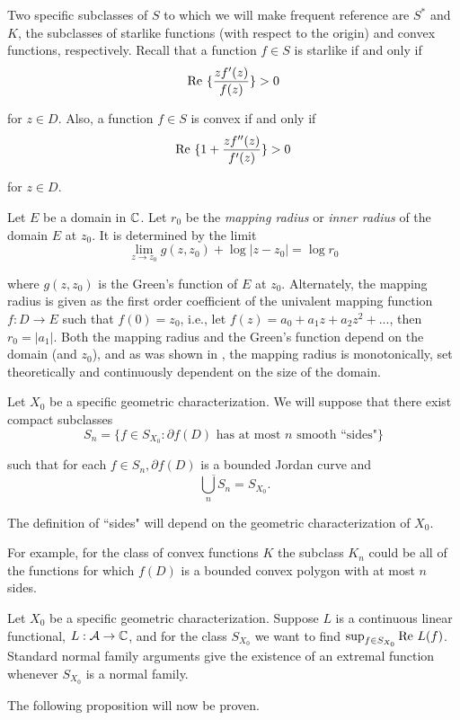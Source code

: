 \documentclass[final]{siamltex}
\begin{document}
Two specific subclasses of $S$ to which we will make frequent reference are $S^*$ and $K$, the subclasses of starlike functions 
(with respect to the origin) and convex functions, respectively. Recall that a function $f \in S$ is starlike if and only if 
$${\rm Re} \  \{ \frac{z f'(z)}{f(z)} \} > 0 $$

\noindent for $z \in D$. Also, a function $f \in S$ is convex if and only if 
$${\rm Re} \  \{ 1 + \frac{z f''(z)}{f'(z)} \} > 0 $$

\noindent for $z \in D$.

Let $E$ be a domain in $\Bbb  C$.  Let $r_0$ be the {\em mapping radius} or {\em inner radius} of the domain $E$ at $z_0$.
It is determined by the limit
$$ \lim_{z \to z_0} g(z,z_0) + \log |z - z_0| = \log r_0$$

\noindent where $g(z,z_0)$ is the Green's function of $E$ at $z_0$.  Alternately, the mapping radius is given as
the first order coefficient of the univalent mapping function $f : D \rightarrow E$ such that $f(0) = z_0$, i.e., let 
$f(z) = a_0 + a_1 z + a_2 z^2 + . . . $, then $r_0 = |a_1|$.
Both the mapping radius and the Green's function depend on the
domain (and $z_0$), and as was shown in \cite{Hayman1}, the mapping radius is monotonically, set theoretically and 
continuously dependent on the size of the domain.

Let $X_0$ be a specific geometric characterization.  We will suppose that there exist compact subclasses
$$S_n = \{ f \in S_{X_0} : \partial f(D) \mbox{ has at most } n \mbox{ smooth ``sides"} \}$$

\noindent such that for each $f \in S_n, \partial f(D)$ is a bounded Jordan curve and 
$$\overline{\ \bigcup\limits_n S_n} = S_{X_0}.$$

\noindent The definition of ``sides" will depend on the geometric characterization of $X_0$.

For example, for the class of convex functions $K$ the subclass $K_n$ could be all of the functions for which $f(D)$ is a bounded
convex polygon with at most $n$ sides.

Let $X_0$ be a specific geometric characterization.  Suppose $L$ is a continuous linear functional, $L : {\cal A} \rightarrow {\Bbb C}$, and for the 
class $S_{X_0}$ we want to find $\sup_{f \in S_{X_0}} {\rm Re} \  L(f)$.  Standard normal family arguments give the
existence of an extremal function whenever $S_{X_0}$ is a normal family.  

The following proposition will now be proven.
\end{document}
